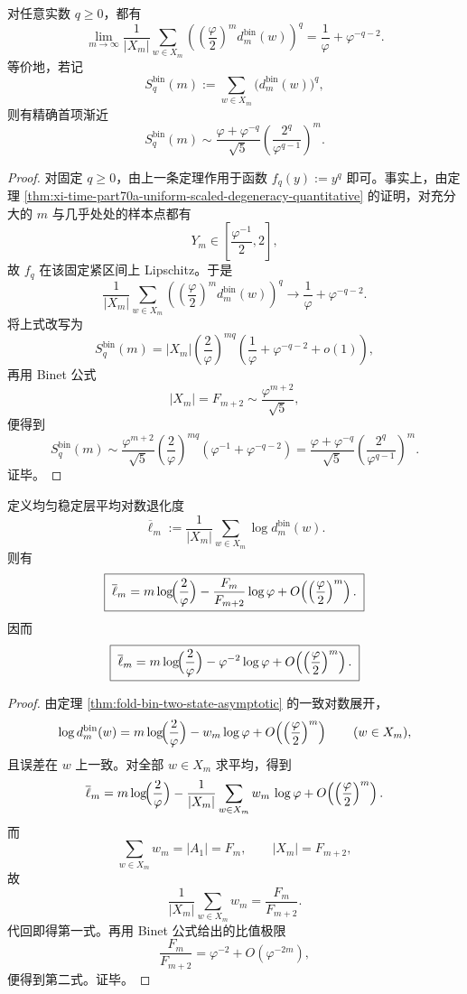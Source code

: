 \begin{corollary}\label{cor:xi-time-part70a-scaled-moments-leading-constant}
对任意实数 \(q\ge 0\)，都有
\[
\lim_{m\to\infty}
\frac{1}{|X_m|}
\sum_{w\in X_m}
\left(
\left(\frac{\varphi}{2}\right)^m d_m^{\mathrm{bin}}(w)
\right)^q
=
\frac{1}{\varphi}+\varphi^{-q-2}.
\]
等价地，若记
\[
S_q^{\mathrm{bin}}(m):=\sum_{w\in X_m}\bigl(d_m^{\mathrm{bin}}(w)\bigr)^q,
\]
则有精确首项渐近
\[
\boxed{\;
S_q^{\mathrm{bin}}(m)
\sim
\frac{\varphi+\varphi^{-q}}{\sqrt5}
\left(\frac{2^q}{\varphi^{q-1}}\right)^m.\;}
\]
\end{corollary}
\begin{proof}
对固定 \(q\ge 0\)，由上一条定理作用于函数 \(f_q(y):=y^q\) 即可。事实上，由定理 \ref{thm:xi-time-part70a-uniform-scaled-degeneracy-quantitative} 的证明，对充分大的 \(m\) 与几乎处处的样本点都有
\[
Y_m\in\left[\frac{\varphi^{-1}}{2},2\right],
\]
故 \(f_q\) 在该固定紧区间上 Lipschitz。于是
\[
\frac{1}{|X_m|}
\sum_{w\in X_m}
\left(
\left(\frac{\varphi}{2}\right)^m d_m^{\mathrm{bin}}(w)
\right)^q
\to
\frac{1}{\varphi}+\varphi^{-q-2}.
\]
将上式改写为
\[
S_q^{\mathrm{bin}}(m)
=
|X_m|
\left(\frac{2}{\varphi}\right)^{mq}
\left(\frac{1}{\varphi}+\varphi^{-q-2}+o(1)\right),
\]
再用 Binet 公式
\[
|X_m|=F_{m+2}\sim \frac{\varphi^{m+2}}{\sqrt5},
\]
便得到
\[
S_q^{\mathrm{bin}}(m)
\sim
\frac{\varphi^{m+2}}{\sqrt5}
\left(\frac{2}{\varphi}\right)^{mq}
\left(\varphi^{-1}+\varphi^{-q-2}\right)
=
\frac{\varphi+\varphi^{-q}}{\sqrt5}
\left(\frac{2^q}{\varphi^{q-1}}\right)^m.
\]
证毕。
\end{proof}

\begin{theorem}[均匀稳定层平均对数退化度的二态展开]\label{thm:xi-time-part70a-uniform-average-logdeg-two-state}
定义均匀稳定层平均对数退化度
\[
\overline{\ell}_m
:=
\frac{1}{|X_m|}\sum_{w\in X_m}\log d_m^{\mathrm{bin}}(w).
\]
则有
\[
\boxed{\;
\overline{\ell}_m
=
m\log\!\Bigl(\frac{2}{\varphi}\Bigr)
-\frac{F_m}{F_{m+2}}\log\varphi
+O\!\left(\left(\frac{\varphi}{2}\right)^m\right).\;}
\]
因而
\[
\boxed{\;
\overline{\ell}_m
=
m\log\!\Bigl(\frac{2}{\varphi}\Bigr)
-\varphi^{-2}\log\varphi
+O\!\left(\left(\frac{\varphi}{2}\right)^m\right).\;}
\]
\end{theorem}
\begin{proof}
由定理 \ref{thm:fold-bin-two-state-asymptotic} 的一致对数展开，
\[
\log d_m^{\mathrm{bin}}(w)
=
m\log\!\Bigl(\frac{2}{\varphi}\Bigr)
-w_m\log\varphi
+O\!\left(\left(\frac{\varphi}{2}\right)^m\right)
\qquad (w\in X_m),
\]
且误差在 \(w\) 上一致。对全部 \(w\in X_m\) 求平均，得到
\[
\overline{\ell}_m
=
m\log\!\Bigl(\frac{2}{\varphi}\Bigr)
-\frac{1}{|X_m|}\sum_{w\in X_m}w_m\,\log\varphi
+O\!\left(\left(\frac{\varphi}{2}\right)^m\right).
\]
而
\[
\sum_{w\in X_m}w_m=|A_1|=F_m,
\qquad
|X_m|=F_{m+2},
\]
故
\[
\frac{1}{|X_m|}\sum_{w\in X_m}w_m=\frac{F_m}{F_{m+2}}.
\]
代回即得第一式。再用 Binet 公式给出的比值极限
\[
\frac{F_m}{F_{m+2}}=\varphi^{-2}+O(\varphi^{-2m}),
\]
便得到第二式。证毕。
\end{proof}

